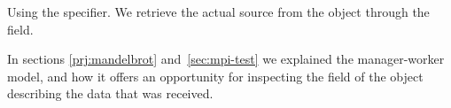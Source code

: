 Using the  specifier. We retrieve the
actual source from the  object through the
 field.
%
%

In sections \ref{prj:mandelbrot} and~\ref{sec:mpi-test} we explained
the manager-worker model, and how it offers an opportunity for inspecting the
 field of the 
object describing the data that was received.


\endinput

\Level 1 {Examples}

\mpiexample{MPI_Send}

A regular ping-pong operation with \indexmpishow{MPI_Send} and
\indexmpishow{MPI_Recv}. We repeat the experiment multiple times to
get a reliable measurement of the time taken.
%
\cverbatimsnippet{pingpong}
%
\pverbatimsnippet{pingpongp}
%
\pverbatimsnippet{pingpongpp}

\mpiexample{MPI_Recv}


\mpiexample{MPI_Sendrecv}

We set up a ring structure and use \n{MPI_Sendrecv} to communicate
between pairs.
%
\cverbatimsnippet{sendrecvring}

